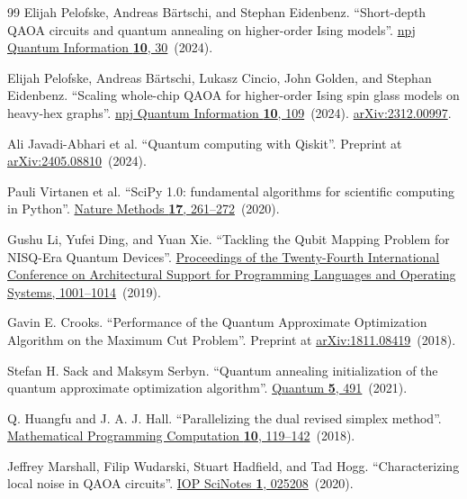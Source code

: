 \documentclass[a4paper,onecolumn,11pt,unpublished]{quantumarticle}
\theoremstyle{remark}
\begin{document}
\begin{thebibliography}{99}
Elijah Pelofske, Andreas B{\"a}rtschi, and Stephan Eidenbenz.
\newblock ``Short-depth QAOA circuits and quantum annealing on higher-order Ising models''.
\newblock \href{https://dx.doi.org/10.1038/s41534-024-00825-w}{npj Quantum Information {\bf 10}, 30}~(2024).

Elijah Pelofske, Andreas B{\"a}rtschi, Lukasz Cincio, John Golden, and Stephan Eidenbenz.
\newblock ``Scaling whole-chip QAOA for higher-order Ising spin glass models on heavy-hex graphs''.
\newblock \href{https://dx.doi.org/10.1038/s41534-024-00906-w}{npj Quantum Information {\bf 10}, 109}~(2024).
\newblock \href{http://arxiv.org/abs/2312.00997}{arXiv:2312.00997}.

Ali Javadi-Abhari et al.
\newblock ``Quantum computing with Qiskit''.
\newblock Preprint at \href{https://arxiv.org/abs/2405.08810}{arXiv:2405.08810}~(2024).


Pauli Virtanen et al.
\newblock ``SciPy 1.0: fundamental algorithms for scientific computing in Python''.
\newblock \href{https://doi.org/10.1038/s41592-019-0686-2}{Nature Methods {\bf 17}, 261--272}~(2020).


Gushu Li, Yufei Ding, and Yuan Xie.
\newblock ``Tackling the Qubit Mapping Problem for NISQ-Era Quantum Devices''.
\newblock \href{https://doi.org/10.1145/3297858.3304023}{Proceedings of the Twenty-Fourth International Conference on Architectural Support for Programming Languages and Operating Systems, 1001--1014}~(2019).


Gavin E. Crooks.
\newblock ``Performance of the Quantum Approximate Optimization Algorithm on the Maximum Cut Problem''.
\newblock Preprint at \href{https://arxiv.org/abs/1811.08419}{arXiv:1811.08419}~(2018).


Stefan H. Sack and Maksym Serbyn.
\newblock ``Quantum annealing initialization of the quantum approximate optimization algorithm''.
\newblock \href{https://doi.org/10.22331/q-2021-07-01-491}{Quantum {\bf 5}, 491}~(2021).


Q. Huangfu and J. A. J. Hall.
\newblock ``Parallelizing the dual revised simplex method''.
\newblock \href{https://doi.org/10.1007/s12532-017-0130-5}{Mathematical Programming Computation {\bf 10}, 119--142}~(2018).


Jeffrey Marshall, Filip Wudarski, Stuart Hadfield, and Tad Hogg.
\newblock ``Characterizing local noise in QAOA circuits''.
\newblock \href{https://doi.org/10.1088/2633-1357/abb0d7}{IOP SciNotes {\bf 1}, 025208}~(2020).



\end{thebibliography}
\end{document}
